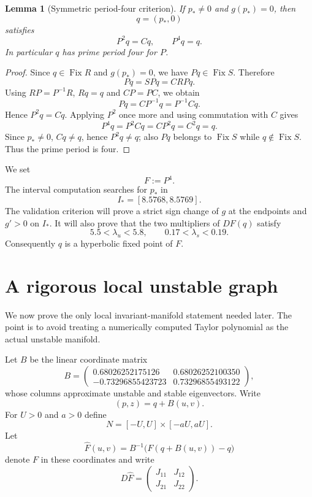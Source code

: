 \documentclass[11pt]{article}
\newtheorem{lemma}[theorem]{Lemma}
\newcommand{\Fix}{\operatorname{Fix}}
\begin{document}
\begin{lemma}[Symmetric period-four criterion]\label{lem:period4}
If $p_*\ne0$ and $g(p_*)=0$, then
\[
 q=(p_*,0)
\]
satisfies
\[
 P^2q=Cq,\qquad P^4q=q.
\]
In particular $q$ has prime period four for $P$.
\end{lemma}

\begin{proof}
Since $q\in\Fix R$ and $g(p_*)=0$, we have
$Pq\in\Fix S$.  Therefore
\[
 Pq=SPq=CRPq.
\]
Using $RP=P^{-1}R$, $Rq=q$ and $CP=PC$, we obtain
\[
 Pq=CP^{-1}q=P^{-1}Cq.
\]
Hence $P^2q=Cq$.  Applying $P^2$ once more and using commutation with $C$
gives
\[
 P^4q=P^2Cq=CP^2q=C^2q=q.
\]
Since $p_*\ne0$, $Cq\ne q$, hence $P^2q\ne q$; also $Pq$ belongs to
$\Fix S$ while $q\notin\Fix S$.  Thus the prime period is four.
\end{proof}

We set
\begin{equation}\label{eq:F}
 F:=P^4.
\end{equation}
The interval computation searches for $p_*$ in
\begin{equation}\label{eq:pbracket}
 I_*=[8.5768,8.5769].
\end{equation}
The validation criterion will prove a strict sign change of $g$ at the
endpoints and $g'>0$ on $I_*$.  It will also prove that the two multipliers
of $DF(q)$ satisfy
\begin{equation}\label{eq:multipliertarget}
 5.5<\lambda_u<5.8,
 \qquad
 0.17<\lambda_s<0.19.
\end{equation}
Consequently $q$ is a hyperbolic fixed point of $F$.

\section{A rigorous local unstable graph}\label{sec:graph}

We now prove the only local invariant-manifold statement needed later.
The point is to avoid treating a numerically computed Taylor polynomial as
the actual unstable manifold.

Let $B$ be the linear coordinate matrix
\begin{equation}\label{eq:B}
 B=
 \begin{pmatrix}
 0.68026252175126 & 0.68026252100350\\
 -0.73296855423723& 0.73296855493122
 \end{pmatrix},
\end{equation}
whose columns approximate unstable and stable eigenvectors.
Write
\[
 (p,z)=q+B(u,v).
\]
For $U>0$ and $a>0$ define
\begin{equation}\label{eq:N}
 N=[-U,U]\times[-aU,aU].
\end{equation}
Let
\[
 \widehat F(u,v)
 =
 B^{-1}\bigl(F(q+B(u,v))-q\bigr)
\]
denote $F$ in these coordinates and write
\[
 D\widehat F=
 \begin{pmatrix}
 J_{11}&J_{12}\\
 J_{21}&J_{22}
 \end{pmatrix}.
\]
\end{document}
